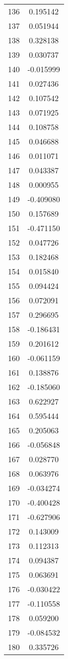 \documentclass[12pt]{article}
\begin{document}
\begin{longtable}{@{}cc@{}}
136 & 0.195142 \\
137 & 0.051944 \\
138 & 0.328138 \\
139 & 0.030737 \\
140 & -0.015999 \\
141 & 0.027436 \\
142 & 0.107542 \\
143 & 0.071925 \\
144 & 0.108758 \\
145 & 0.046688 \\
146 & 0.011071 \\
147 & 0.043387 \\
148 & 0.000955 \\
149 & -0.409080 \\
150 & 0.157689 \\
151 & -0.471150 \\
152 & 0.047726 \\
153 & 0.182468 \\
154 & 0.015840 \\
155 & 0.094424 \\
156 & 0.072091 \\
157 & 0.296695 \\
158 & -0.186431 \\
159 & 0.201612 \\
160 & -0.061159 \\
161 & 0.138876 \\
162 & -0.185060 \\
163 & 0.622927 \\
164 & 0.595444 \\
165 & 0.205063 \\
166 & -0.056848 \\
167 & 0.028770 \\
168 & 0.063976 \\
169 & -0.034274 \\
170 & -0.400428 \\
171 & -0.627906 \\
172 & 0.143009 \\
173 & 0.112313 \\
174 & 0.094387 \\
175 & 0.063691 \\
176 & -0.030422 \\
177 & -0.110558 \\
178 & 0.059200 \\
179 & -0.084532 \\
180 & 0.335726 \\

\end{longtable}
\end{document}
